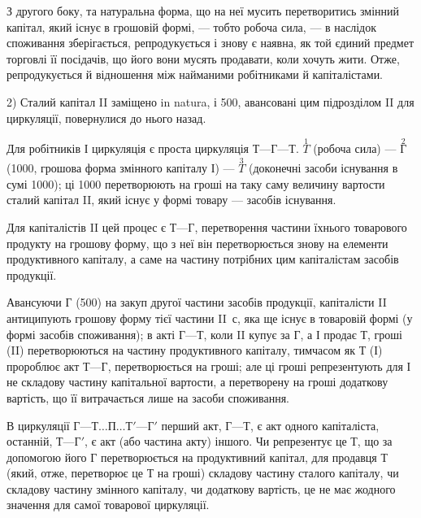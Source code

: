 
З другого боку, та натуральна форма, що на неї мусить перетворитись
змінний капітал, який існує в грошовій формі, — тобто робоча сила, —
в наслідок споживання зберігається, репродукується і знову є наявна,
як той єдиний предмет торговлі її посідачів, що його вони мусять продавати,
коли хочуть жити. Отже, репродукується й відношення між найманими
робітниками й капіталістами.

2) Сталий капітал II заміщено in natura, і 500, авансовані
цим підрозділом II для циркуляції, повернулися до нього назад.

Для робітників І циркуляція є проста циркуляція $Т — Г — Т$. $\overset{1}{T}$ (робоча
сила) — $\overset{2}{Г}$ (1000, грошова форма змінного капіталу І) — $\overset{3}{T}$
(доконечні засоби існування в сумі 1000); ці 1000
перетворюють на гроші на таку саму величину вартости сталий капітал II,
який існує у формі товару — засобів існування.

Для капіталістів II цей процес є $Т — Г$, перетворення частини їхнього
товарового продукту на грошову форму, що з неї він перетворюється
знову на елементи продуктивного капіталу, а саме на частину потрібних
цим капіталістам засобів продукції.

Авансуючи $Г$ (500) на закуп другої частини засобів продукції,
капіталісти II антиципують грошову форму тієї частини II~$с$, яка
ще існує в товаровій формі (у формі засобів споживання); в акті $Г — Т$,
коли II купує за $Г$, а І продає $Т$, гроші (II) перетворюються на частину
продуктивного капіталу, тимчасом як $Т$ (І) пророблює акт $Т — Г$, перетворюється
на гроші; але ці гроші репрезентують для І не складову частину
капітальної вартости, а перетворену на гроші додаткову вартість, що її
витрачається лише на засоби споживання.

В циркуляції $Г — Т\dots{} П\dots{} Т' — Г'$ перший акт, $Г — Т$, є акт одного капіталіста,
останній, $Т — Г'$, є акт (або частина акту) іншого. Чи репрезентує
це $Т$, що за допомогою його $Г$ перетворюється на продуктивний капітал,
для продавця $Т$ (який, отже, перетворює це $Т$ на гроші) складову частину
сталого капіталу, чи складову частину змінного капіталу, чи додаткову
вартість, це не має жодного значення для самої товарової циркуляції.


